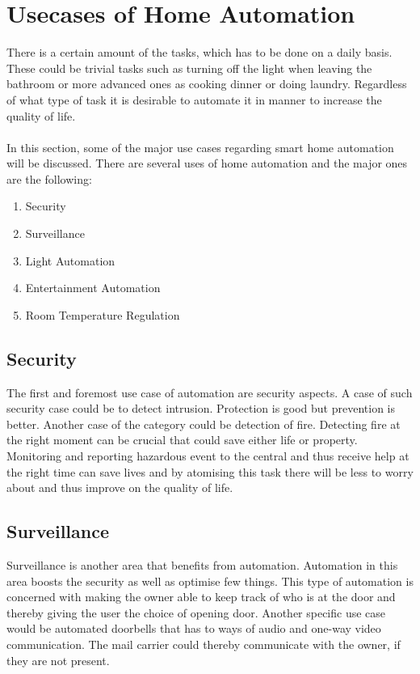 \section{Usecases of Home Automation}
\label{sec:Usecases of Home Automation}
There is a certain amount of the tasks, which has to be done on a daily basis. These could be trivial tasks such as turning off the light when leaving the bathroom or more advanced ones as cooking dinner or doing laundry. Regardless of what type of task it is desirable to automate it in manner to increase the quality of life.
\\\\
In this section, some of the major use cases regarding smart home automation will be discussed. There are several uses of home automation and the major ones are the following:

\begin{enumerate}
  \item Security
  \item Surveillance
  \item Light Automation
  \item Entertainment Automation
  \item Room Temperature Regulation
\end{enumerate}

\subsection{Security}
\label{sub:Security}
The first and foremost use case of automation are security aspects. A case of such security case could be to detect intrusion. Protection is good but prevention is better. Another case of the category could be detection of fire. Detecting fire at the right moment can be crucial that could save either life or property. Monitoring and reporting hazardous event to the central and thus receive help at the right time can save lives and by atomising this task there will be less to worry about and thus improve on the quality of life.

\subsection{Surveillance}
\label{sub:Surveillance}
Surveillance is another area that benefits from automation. Automation in this area boosts the security as well as optimise few things. This type of automation is concerned with making the owner able to keep track of who is at the door and thereby giving the user the choice of opening door. Another specific use case would be automated doorbells that has to ways of audio and one-way video communication. The mail carrier could thereby communicate with the owner, if they are not present.

